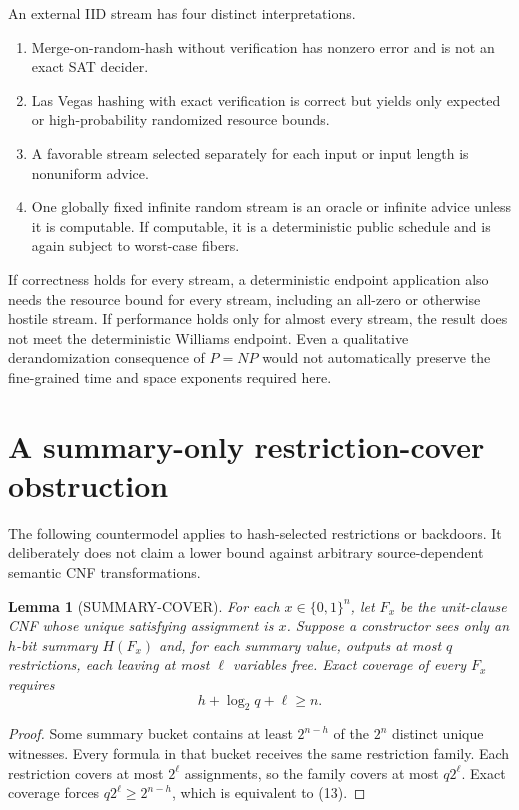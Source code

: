 \documentclass[11pt]{article}
\newtheorem{lemma}[theorem]{Lemma}
\begin{document}
An external IID stream has four distinct interpretations.
\begin{enumerate}
\item Merge-on-random-hash without verification has nonzero error and is not
an exact SAT decider.
\item Las Vegas hashing with exact verification is correct but yields only
expected or high-probability randomized resource bounds.
\item A favorable stream selected separately for each input or input length
is nonuniform advice.
\item One globally fixed infinite random stream is an oracle or infinite
advice unless it is computable.  If computable, it is a deterministic public
schedule and is again subject to worst-case fibers.
\end{enumerate}

If correctness holds for every stream, a deterministic endpoint application
also needs the resource bound for every stream, including an all-zero or
otherwise hostile stream.  If performance holds only for almost every stream,
the result does not meet the deterministic Williams endpoint.  Even a
qualitative derandomization consequence of $P=NP$ would not automatically
preserve the fine-grained time and space exponents required here.

\section{A summary-only restriction-cover obstruction}

The following countermodel applies to hash-selected restrictions or
backdoors.  It deliberately does not claim a lower bound against arbitrary
source-dependent semantic CNF transformations.

\begin{lemma}[SUMMARY-COVER]
For each $x\in\{0,1\}^n$, let $F_x$ be the unit-clause CNF whose unique
satisfying assignment is $x$.  Suppose a constructor sees only an $h$-bit
summary $H(F_x)$ and, for each summary value, outputs at most $q$
restrictions, each leaving at most $\ell$ variables free.  Exact coverage of
every $F_x$ requires
\[
 \boxed{h+\log_2q+\ell\ge n.}
 \tag{13}
\]
\end{lemma}

\begin{proof}
Some summary bucket contains at least $2^{n-h}$ of the $2^n$ distinct unique
witnesses.  Every formula in that bucket receives the same restriction
family.  Each restriction covers at most $2^\ell$ assignments, so the family
covers at most $q2^\ell$.  Exact coverage forces
$q2^\ell\ge2^{n-h}$, which is equivalent to (13).
\end{proof}
\end{document}

